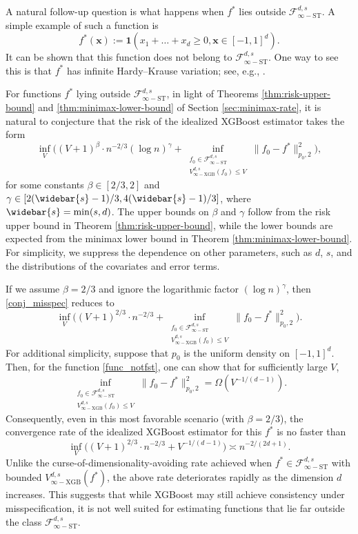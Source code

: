 \documentclass[10pt]{article}
\newcommand{\fstinf}{{\mathcal{F}^{d, s}_{\infty-\text{ST}}}}
\newcommand{\vinfxgb}{{V^{d, s}_{\infty-\text{XGB}}}}
\newcommand{\xbf}{{\mathbf{x}}}
\newcommand{\ind}{{\mathbf{1}}}
\begin{document}
A natural follow-up question is what happens when $f^*$ lies outside
$\fstinf$. A simple example of such a function is
\begin{equation}\label{func_notfst}
    f^*(\xbf) := \ind(x_1 + \dots + x_d \ge 0, \xbf \in [-1, 1]^d).
\end{equation}
It can be shown that this function does not belong to $\fstinf$. One
way to see this is that $f^*$ has infinite Hardy–Krause variation; 
see, e.g., \citet[Proposition 17]{owen2005multidimensional}.

For functions $f^*$ lying outside $\fstinf$, in light of 
Theorems \ref{thm:risk-upper-bound} and \ref{thm:minimax-lower-bound} 
of Section \ref{sec:minimax-rate}, it is natural to conjecture 
that the risk of the idealized XGBoost estimator takes the form
\begin{equation}\label{conj_misspec}
    \inf_{V} \bigg((V + 1)^{\beta} \cdot n^{-2/3} (\log n)^{\gamma}
    + \inf_{\substack{f_0 \in \fstinf \\ \vinfxgb(f_0) \le V}} 
    \|f_0 - f^*\|_{p_0, 2}^2\bigg),
\end{equation}
for some constants $\beta \in [2/3, 2]$ and 
$\gamma \in [2(\widebar{s} - 1)/3, 4(\widebar{s} - 1)/3]$, where 
$\widebar{s} = \min(s, d)$. The upper bounds on $\beta$ and $\gamma$ 
follow from the risk upper bound in Theorem \ref{thm:risk-upper-bound}, 
while the lower bounds are expected from the minimax lower bound in 
Theorem \ref{thm:minimax-lower-bound}. For simplicity, we suppress 
the dependence on other parameters, such as $d$, $s$, and the 
distributions of the covariates and error terms.

If we assume $\beta = 2/3$ and ignore the logarithmic factor 
$(\log n)^{\gamma}$, then \eqref{conj_misspec} reduces to 
\begin{equation*}
    \inf_{V} \bigg((V + 1)^{2/3} \cdot n^{-2/3}
    + \inf_{\substack{f_0 \in \fstinf \\ \vinfxgb(f_0) \le V}} 
    \|f_0 - f^*\|_{p_0, 2}^2\bigg).
\end{equation*}
For additional simplicity, suppose that $p_0$ is the uniform density 
on $[-1, 1]^d$. Then, for the function \eqref{func_notfst}, one can 
show that for sufficiently large $V$, 
\begin{equation*}
    \inf_{\substack{f_0 \in \fstinf \\ \vinfxgb(f_0) \le V}} 
    \|f_0 - f^*\|_{p_0, 2}^2 = \Omega(V^{-1/(d - 1)}). 
\end{equation*}
Consequently, even in this most favorable scenario (with 
$\beta = 2/3$), the convergence rate of the idealized XGBoost 
estimator for this $f^*$ is no faster than 
\begin{equation*}
    \inf_{V} \big((V + 1)^{2/3} \cdot n^{-2/3}
    + V^{-1/(d - 1)}\big) \asymp  n^{-2/(2d + 1)}.  
\end{equation*}
Unlike the curse-of-dimensionality-avoiding rate achieved when 
$f^* \in \fstinf$ with bounded $\vinfxgb(f^*)$, the above rate 
deteriorates rapidly as the dimension $d$ increases. This suggests 
that while XGBoost may still achieve consistency under 
misspecification, it is not well suited for estimating functions 
that lie far outside the class $\fstinf$.
\end{document}
